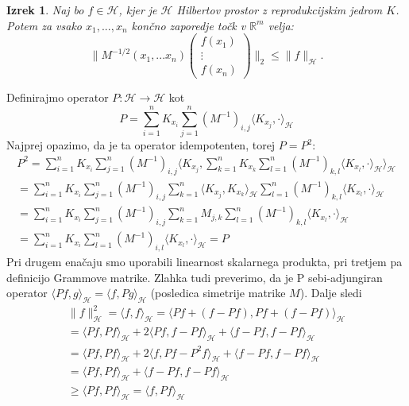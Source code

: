 \documentclass[12pt,a4paper]{amsart}
\theoremstyle{definition} %
\theoremstyle{plain} %
\newtheorem{izrek}[definicija]{Izrek}
\begin{document}
\begin{izrek}
Naj bo $f \in \mathcal{H}$, kjer je $\mathcal{H}$ Hilbertov prostor z reprodukcijskim jedrom $K$. Potem za vsako $x_1, ..., x_n$ končno zaporedje točk v $\mathbb{R}^m$ velja:
$$
\|M^{-1/2}(x_1,...x_n)
\begin{pmatrix}
  f(x_1)  \\
  \vdots     \\
  f(x_n)
 \end{pmatrix}
\|_2 \leq \|f\|_{\mathcal{H}}.
$$
\end{izrek}
\proof 
Definirajmo operator $P: \mathcal{H} \rightarrow \mathcal{H}$ kot 
$$
P = \sum_{i=1}^n K_{x_i} \sum_{j=1}^n (M^{-1})_{i,j} \langle K_{x_j}, \cdot \rangle_{\mathcal{H}}
$$
Najprej opazimo, da je ta operator idempotenten, torej $P = P^2$:
\begin{gather*}
P^2 = \sum_{i=1}^n K_{x_i} \sum_{j=1}^n (M^{-1})_{i,j} \langle K_{x_j}, \sum_{k=1}^n K_{x_k} \sum_{l=1}^n (M^{-1})_{k,l} \langle K_{x_l}, \cdot \rangle_{\mathcal{H}} \rangle_{\mathcal{H}} \\
=  \sum_{i=1}^n K_{x_i} \sum_{j=1}^n (M^{-1})_{i,j} \sum_{k=1}^{n}  \langle K_{x_j}, K_{x_k} \rangle_{\mathcal{H}} \sum_{l=1}^n (M^{-1})_{k,l} \langle K_{x_l}, \cdot \rangle_{\mathcal{H}} \\
=  \sum_{i=1}^n K_{x_i} \sum_{j=1}^n (M^{-1})_{i,j}  \sum_{k=1}^n M_{j,k}  \sum_{l=1}^n (M^{-1})_{k,l} \langle K_{x_l}, \cdot \rangle_{\mathcal{H}} 
\\
= \sum_{i=1}^n K_{x_i} \sum_{l=1}^n (M^{-1})_{i,l}  \langle K_{x_l}, \cdot \rangle_{\mathcal{H}}  = P
\end{gather*}
Pri drugem enačaju smo uporabili linearnost skalarnega produkta, pri tretjem pa definicijo Grammove matrike. Zlahka tudi preverimo, da je P sebi-adjungiran operator $\langle Pf, g\rangle_{\mathcal{H}} = \langle f, Pg\rangle_{\mathcal{H}}$ (posledica simetrije matrike $M$). Dalje sledi 
\begin{gather*}
\|f\|_{\mathcal{H}}^2 = \langle f, f\rangle_{\mathcal{H}} = \langle Pf + (f - Pf), Pf + (f - Pf) \rangle_{\mathcal{H}} \\
= \langle Pf, Pf\rangle_{\mathcal{H}} + 2 \langle Pf,f -  Pf\rangle_{\mathcal{H}} + \langle f - Pf, f - Pf\rangle_{\mathcal{H}} \\
= \langle Pf, Pf\rangle_{\mathcal{H}} + 2 \langle f,Pf -  P^2 f\rangle_{\mathcal{H}} + \langle f - Pf, f - Pf\rangle_{\mathcal{H}} \\
= \langle Pf, Pf\rangle_{\mathcal{H}} +  \langle f - Pf, f - Pf\rangle_{\mathcal{H}} \\
\geq \langle Pf, Pf\rangle_{\mathcal{H}} = \langle f, Pf\rangle_{\mathcal{H}}
\end{gather*}
\end{document}

